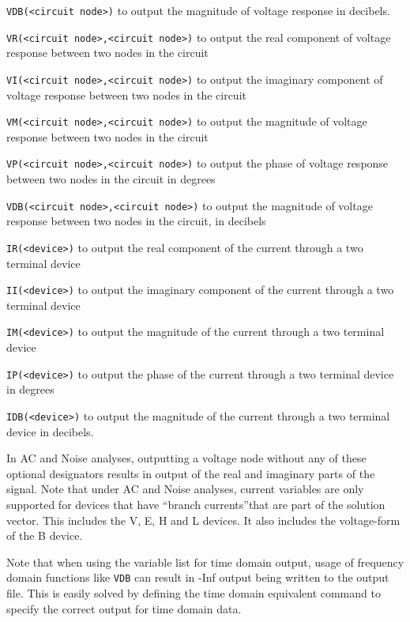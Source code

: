 \begin{Command}
\begin{Arguments}
\begin{XyceItemize}
\item \texttt{VDB(<circuit node>)} to output the magnitude of voltage response in decibels.
\item \texttt{VR(<circuit node>,<circuit node>)} to output the real component of voltage response between two nodes in the circuit
\item \texttt{VI(<circuit node>,<circuit node>)} to output the imaginary component of voltage response between two nodes in the circuit
\item \texttt{VM(<circuit node>,<circuit node>)} to output the magnitude of voltage response between two nodes in the circuit
\item \texttt{VP(<circuit node>,<circuit node>)} to output the phase of voltage response between two nodes in the circuit in degrees
\item \texttt{VDB(<circuit node>,<circuit node>)} to output the magnitude of voltage response between two nodes in the circuit, in decibels
\item \texttt{IR(<device>)} to output the real component of the current through a two terminal device
\item \texttt{II(<device>)} to output the imaginary component of the current through a two terminal device
\item \texttt{IM(<device>)} to output the magnitude of the current through a two terminal device
\item \texttt{IP(<device>)} to output the phase of the current through a two terminal device in degrees
\item \texttt{IDB(<device>)} to output the magnitude of the current through a two terminal device in decibels.
\end{XyceItemize}

In AC and Noise analyses, outputting a voltage node without any of these
optional designators results in output of the real and imaginary parts of the signal.
Note that under AC and Noise analyses, current variables are only supported for
devices that have ``branch currents''that are part of the solution vector. This includes
the V, E, H and L devices.  It also includes the voltage-form of the B device.

Note that when using the variable list for time domain output, usage of
frequency domain functions like \texttt{VDB} can result in -Inf output being
written to the output file.  This is easily solved by defining the time
domain equivalent command to specify the correct output for time domain
data.


\end{Arguments}
\end{Command}

